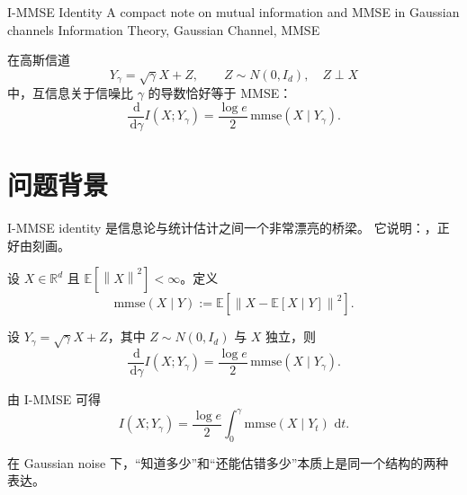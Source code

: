 \documentclass[12pt]{article}
\newcommand{\E}{\mathbb{E}}
\newcommand{\R}{\mathbb{R}}
\newcommand{\dd}{\,\mathrm{d}}
\newcommand{\norm}[1]{\left\lVert #1 \right\rVert}
\begin{document}
\MakeShortHeader
  {I-MMSE Identity}
  {A compact note on mutual information and MMSE in Gaussian channels}
  {Information Theory, Gaussian Channel, MMSE}

\begin{KeyBox}
在高斯信道
\[
Y_\gamma=\sqrt{\gamma}X+Z,\qquad Z\sim N(0,I_d),\quad Z\perp X
\]
中，互信息关于信噪比 \(\gamma\) 的导数恰好等于 MMSE：
\[
\frac{\dd}{\dd\gamma}I(X;Y_\gamma)=\frac{\log e}{2}\,\mathrm{mmse}(X\mid Y_\gamma).
\]
\end{KeyBox}

\section{问题背景}

I-MMSE identity 是信息论与统计估计之间一个非常漂亮的桥梁。
它说明：，正好由刻画。

\begin{XHSDefinition}[MMSE]
设 \(X\in\R^d\) 且 \(\E[\norm{X}^2]<\infty\)。定义
\[
\mathrm{mmse}(X\mid Y):=\E\!\left[\norm{X-\E[X\mid Y]}^2\right].
\]
\end{XHSDefinition}

\begin{XHSTheorem}[I-MMSE]
设 \(Y_\gamma=\sqrt{\gamma}X+Z\)，其中 \(Z\sim N(0,I_d)\) 与 \(X\) 独立，则
\[
\frac{\dd}{\dd\gamma}I(X;Y_\gamma)=\frac{\log e}{2}\,\mathrm{mmse}(X\mid Y_\gamma).
\]
\end{XHSTheorem}

\begin{xhsFormulaBox}[一个常见推论]
由 I-MMSE 可得
\[
I(X;Y_\gamma)=\frac{\log e}{2}\int_0^\gamma \mathrm{mmse}(X\mid Y_t)\,\dd t.
\]
\end{xhsFormulaBox}

\begin{Takeaway}
在 Gaussian noise 下，“知道多少”和“还能估错多少”本质上是同一个结构的两种表达。
\end{Takeaway}
\end{document}
